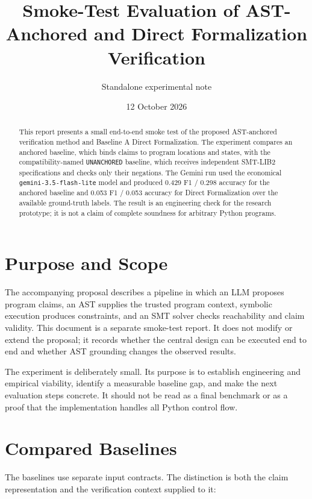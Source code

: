 \documentclass[11pt]{article}
\title{Smoke-Test Evaluation of AST-Anchored and Direct Formalization Verification}
\author{Standalone experimental note}
\date{12 October 2026}
\newcommand{\unanchored}{\texttt{UNANCHORED}}
\begin{document}
\maketitle

\begin{abstract}
This report presents a small end-to-end smoke test of the proposed
AST-anchored verification method and Baseline A Direct Formalization.  The
experiment compares an anchored baseline, which binds claims to program
locations and states, with the compatibility-named \unanchored{} baseline,
which receives independent SMT-LIB2 specifications and checks only their
negations.  The Gemini run used the economical \texttt{gemini-3.5-flash-lite}
model and produced 0.429 F1 / 0.298 accuracy for the anchored baseline and
0.053 F1 / 0.053 accuracy for Direct Formalization over the available
ground-truth labels.  The result is an engineering check for the research
prototype; it is not a claim of complete soundness for arbitrary Python
programs.
\end{abstract}

\section{Purpose and Scope}

The accompanying proposal describes a pipeline in which an LLM proposes
program claims, an AST supplies the trusted program context, symbolic
execution produces constraints, and an SMT solver checks reachability and
claim validity.  This document is a separate smoke-test report.  It does not
modify or extend the proposal; it records whether the central design can be
executed end to end and whether AST grounding changes the observed results.

The experiment is deliberately small.  Its purpose is to establish
engineering and empirical viability, identify a measurable baseline gap, and
make the next evaluation steps concrete.  It should not be read as a final
benchmark or as a proof that the implementation handles all Python control
flow.

\section{Compared Baselines}

The baselines use separate input contracts.  The distinction is both the
claim representation and the verification context supplied to it:
\end{document}
